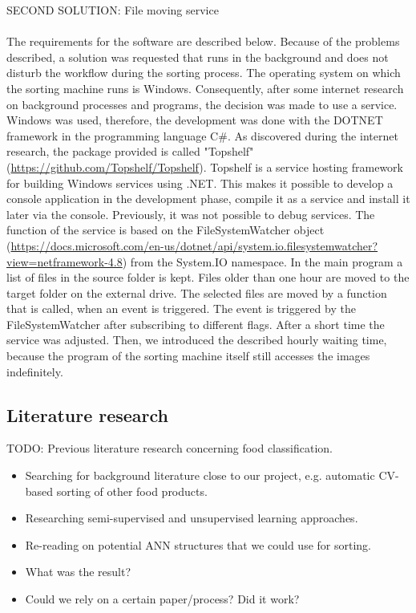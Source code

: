 SECOND SOLUTION: File moving service \\
\\
The requirements for the software are described below. Because of the problems described, a solution was requested that runs in the background and does not disturb the workflow during the sorting process. The operating system on which the sorting machine runs is Windows. Consequently, after some internet research on background processes and programs, the decision was made to use a service. Windows was used, therefore, the development was done with the DOTNET framework in the programming language C#. As discovered during the internet research, the package provided is called "Topshelf" (\url{https://github.com/Topshelf/Topshelf}). Topshelf is a service hosting framework for building Windows services using .NET. This makes it possible to develop a console application in the development phase, compile it as a service and install it later via the console. Previously, it was not possible to debug services. The function of the service is based on the FileSystemWatcher object (\url{https://docs.microsoft.com/en-us/dotnet/api/system.io.filesystemwatcher?view=netframework-4.8}) from the System.IO namespace. In the main program a list of files in the source folder is kept. Files older than one hour are moved to the target folder on the external drive. The selected files are moved by a function that is called, when an event is triggered. The event is triggered by the FileSystemWatcher after subscribing to different flags. After a short time the service was adjusted. Then, we introduced the described hourly waiting time, because the program of the sorting machine itself still accesses the images indefinitely.

\subsection{Literature research}

TODO: Previous literature research concerning food classification.

\begin{itemize}
\item Searching for background literature close to our project, e.g. automatic CV-based sorting of other food products.
\item Researching semi-supervised and unsupervised learning approaches.
\item Re-reading on potential ANN structures that we could use for sorting.
\item What was the result?
\item Could we rely on a certain paper/process? Did it work?
\end{itemize}


